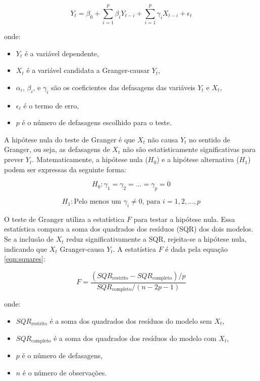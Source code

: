 \documentclass[12pt,oneside,a4paper,chapter=TITLE,english,brazil,sumario=abnt-6027-2012]{abntex2}
\begin{document}
\begin{equation}
	Y_t = \beta_0 + \sum_{i=1}^{p} \beta_i Y_{t-i} + \sum_{i=1}^{p} \gamma_i X_{t-i} + \epsilon_t
\end{equation}

onde:

\begin{itemize}
	\item \( Y_t \) é a variável dependente,
	\item \( X_t \) é a variável candidata a Granger-causar \( Y_t \),
	\item \( \alpha_i \), \( \beta_i \), e \( \gamma_i \) são os coeficientes das defasagens das variáveis \( Y_t \) e \( X_t \),
	\item \( \epsilon_t \) é o termo de erro,
	\item \( p \) é o número de defasagens escolhido para o teste.
\end{itemize}

A hipótese nula do teste de Granger é que \( X_t \) não causa \( Y_t \) no sentido de Granger, ou seja, as defasagens de \( X_t \) não são estatisticamente significativas para prever \( Y_t \). Matematicamente, a hipótese nula (\( H_0 \)) e a hipótese alternativa (\( H_1 \)) podem ser expressas da seguinte forma:

\begin{equation}
	H_0: \gamma_1 = \gamma_2 = \dots = \gamma_p = 0
\end{equation}

\begin{equation}
	H_1: \text{Pelo menos um } \gamma_i \neq 0 \text{, para } i = 1, 2, \dots, p
\end{equation}

O teste de Granger utiliza a estatística \( F \) para testar a hipótese nula. Essa estatística compara a soma dos quadrados dos resíduos (SQR) dos dois modelos. Se a inclusão de \( X_t \) reduz significativamente a SQR, rejeita-se a hipótese nula, indicando que \( X_t \) Granger-causa \( Y_t \). A estatística \( F \) é dada pela equação \ref{eqn:squares}:

\begin{equation}
	\label{eqn:squares}
	F = \frac{(SQR_{\text{restrito}} - SQR_{\text{completo}})/p}{SQR_{\text{completo}}/(n - 2p - 1)}
\end{equation}

onde:

\begin{itemize}
	\item \( SQR_{\text{restrito}} \) é a soma dos quadrados dos resíduos do modelo sem \( X_t \),
	\item \( SQR_{\text{completo}} \) é a soma dos quadrados dos resíduos do modelo com \( X_t \),
	\item \( p \) é o número de defasagens,
	\item \( n \) é o número de observações.
\end{itemize}
\end{document}

